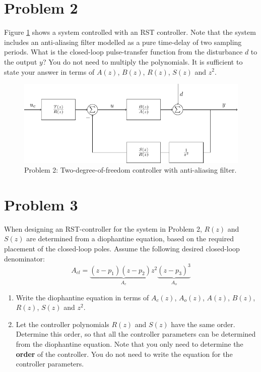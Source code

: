 \documentclass[a4paper]{scrartcl}
\begin{document}
\section*{Problem 2}
\label{sec-2}
Figure \ref{fig:rst} shows a system controlled with an RST controller. Note that the system includes an anti-aliasing filter modelled as a pure time-delay of two sampling periods. What is the closed-loop pulse-transfer function from the disturbance $d$ to the output $y$? You do not need to multiply the polynomials. It is sufficient to state your answer in terms of $A(z)$, $B(z)$, $R(z)$, $S(z)$ and $z^2$.
\begin{figure}[h]
\begin{center}
\includegraphics[]{rst-anti-aliasing}
\caption{Problem 2: Two-degree-of-freedom controller with anti-aliasing filter.}
\label{fig:rst}
\end{center}
\end{figure}


\section*{Problem 3}
\label{sec-3}
When designing an RST-controller for the system in Problem 2, $R(z)$ and $S(z)$ are determined from a diophantine equation, based on the required placement of the closed-loop poles. Assume the following desired closed-loop denominator:
\begin{equation}
A_{cl} = \underbrace{(z-p_1)(z-p_2)z^2}_{A_c}\underbrace{(z-p_3)^3}_{A_o}
\end{equation}
\begin{enumerate}
\item Write the diophantine equation in terms of $A_c(z)$, $A_o(z)$, $A(z)$, $B(z)$, $R(z)$, $S(z)$ and $z^2$.
\item Let the controller polynomials $R(z)$ and $S(z)$ have the same order. Determine this order, so that all the controller parameters can be determined from the diophantine equation. Note that you only need to determine the \textbf{order} of the controller. You do not need to write the equation for the controller parameters.
\end{enumerate}
\end{document}

